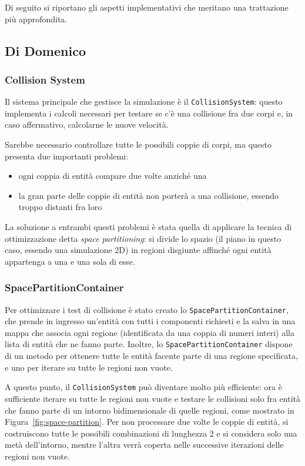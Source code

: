 Di seguito si riportano gli aspetti implementativi che meritano una trattazione più approfondita.

\subsection{Di Domenico}\label{subsec:demo-di-domenico}

\subsubsection{Collision System}
Il sistema principale che gestisce la simulazione è il \texttt{CollisionSystem}: questo implementa i calcoli necessari
per testare se c'è una collisione fra due corpi e, in caso affermativo, calcolarne le nuove velocità.

Sarebbe necessario controllare tutte le possibili coppie di corpi, ma questo presenta due importanti problemi:
\begin{itemize}
    \item ogni coppia di entità compare due volte anziché una
    \item la gran parte delle coppie di entità non porterà a una collisione, essendo troppo distanti fra loro
\end{itemize}

La soluzione a entrambi questi problemi è stata quella di applicare la tecnica di ottimizzazione detta
\textit{space partitioning}: si divide lo spazio (il piano in questo caso, essendo una simulazione 2D) in regioni disgiunte
affinché ogni entità appartenga a una e una sola di esse.

\subsubsection{SpacePartitionContainer}
Per ottimizzare i test di collisione è stato creato lo \texttt{SpacePartitionContainer}, che prende in ingresso
un'entità con tutti i componenti richiesti e la salva in una mappa che associa ogni regione (identificata da una coppia
di numeri interi) alla lista di entità che ne fanno parte.
Inoltre, lo \texttt{SpacePartitionContainer} dispone di un metodo per ottenere tutte le entità facente parte di una regione
specificata, e uno per iterare su tutte le regioni non vuote.

A questo punto, il \texttt{CollisionSystem} può diventare molto più efficiente: ora è sufficiente iterare su tutte le regioni
non vuote e testare le collisioni solo fra entità che fanno parte di un intorno bidimensionale di quelle regioni, come
mostrato in Figura~\ref{fig:space-partition}.
Per non processare due volte le coppie di entità, si costruiscono tutte le possibili combinazioni di lunghezza 2 e si
considera solo una metà dell'intorno, mentre l'altra verrà coperta nelle successive iterazioni delle regioni non vuote.

